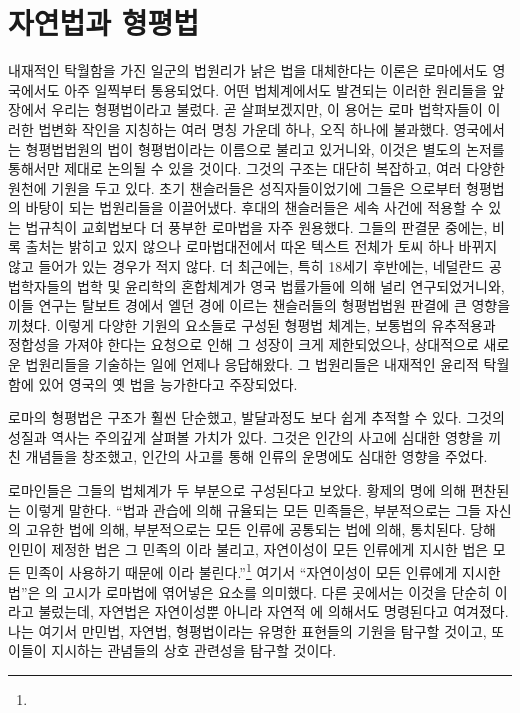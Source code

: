 \chapter{자연법과 형평법}

내재적인 탁월함을 가진
일군의 법원리가
낡은 법을 대체한다는 이론은
로마에서도 영국에서도 아주 일찍부터 통용되었다.
어떤 법체계에서도 발견되는
이러한 원리들을 앞 장에서 우리는 형평법이라고 불렀다.
곧 살펴보겠지만, 이 용어는
로마 법학자들이 이러한 법변화 작인을 지칭하는
여러 명칭 가운데 하나, 오직 하나에 불과했다.
영국에서는 형평법법원의 법이
형평법이라는 이름으로 불리고 있거니와,
이것은 별도의 논저를 통해서만 제대로 논의될 수 있을 것이다.
그것의 구조는 대단히 복잡하고, 여러 다양한 원천에 기원을 두고 있다.
초기 챈슬러들은 성직자들이었기에 그들은 으로부터
형평법의 바탕이 되는 법원리들을 이끌어냈다.
후대의 챈슬러들은
세속 사건에 적용할 수 있는 법규칙이 교회법보다 더 풍부한 로마법을
자주 원용했다.
그들의 판결문 중에는, 비록 출처는 밝히고 있지 않으나
로마법대전에서 따온 텍스트 전체가 토씨 하나 바뀌지 않고
들어가 있는 경우가 적지 않다.
더 최근에는, 특히 18세기 후반에는,
네덜란드 공법학자들의 법학 및 윤리학의 혼합체계가 영국 법률가들에 의해
널리 연구되었거니와,
이들 연구는
탈보트 경에서 엘던 경에 이르는
챈슬러들의 형평법법원 판결에 큰 영향을 끼쳤다.
이렇게 다양한 기원의 요소들로 구성된 형평법 체계는,
보통법의 유추적용과 정합성을 가져야 한다는 요청으로 인해
그 성장이 크게 제한되었으나,
상대적으로 새로운 법원리들을 기술하는 일에 언제나 응답해왔다.
그 법원리들은 내재적인 윤리적 탁월함에 있어 영국의 옛 법을 능가한다고
주장되었다.

로마의 형평법은 구조가 훨씬 단순했고, 발달과정도 보다 쉽게 추적할 수 있다.
그것의 성질과 역사는 주의깊게 살펴볼 가치가 있다.
그것은 인간의 사고에 심대한 영향을 끼친 개념들을 창조했고,
인간의 사고를 통해 인류의 운명에도 심대한 영향을 주었다.

로마인들은 그들의 법체계가 두 부분으로 구성된다고 보았다.
 황제의 명에 의해 편찬된 는 이렇게 말한다.
``법과 관습에 의해 규율되는 모든 민족들은, 부분적으로는 그들 자신의
고유한 법에 의해, 부분적으로는 모든 인류에 공통되는 법에 의해,
통치된다. 당해 인민이 제정한 법은 그 민족의 이라
불리고, 자연이성이 모든 인류에게 지시한 법은
모든 민족이 사용하기 때문에
이라 불린다.''\footnote{%
  }
여기서 ``자연이성이 모든 인류에게 지시한 법''은 의 고시가
로마법에 엮어넣은 요소를 의미했다.
다른 곳에서는 이것을 단순히 이라고 불렀는데,
자연법은 자연이성뿐 아니라 자연적 에 의해서도
명령된다고 여겨졌다.
나는 여기서 만민법, 자연법, 형평법이라는 유명한 표현들의 기원을 탐구할 것이고,
또 이들이 지시하는 관념들의 상호 관련성을 탐구할 것이다.

